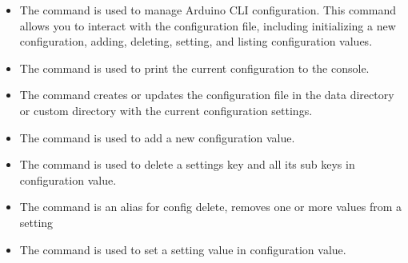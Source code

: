 \begin{itemize}
	  \item {}
	
	The command  is used to manage Arduino CLI configuration. This command allows you to interact with the configuration file, including initializing a new configuration, adding, deleting, setting, and listing configuration values.
	
	
	\item {}
	
	The command  is used to print the current configuration to the console.
	
	
	\item {}
	
	The command  creates or updates the configuration file in the data directory or custom directory with the current configuration settings.
	
	
	\item {}
	
	The command  is used to add a new configuration value.
	
	
	\item {}
	
	The command  is used to delete a settings key and all its sub keys in configuration value.
	
	
	\item {}
	
	The command  is an alias for config delete, removes one or more values from a setting
	
	
	\item {}
	
	The command  is used to set a setting value in configuration value.
	
	

\end{itemize}

